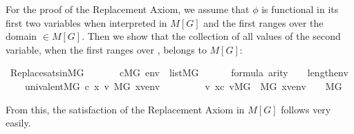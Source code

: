 For the proof of the Replacement Axiom, we assume that $\phi$ is
functional in its first two variables when interpreted in $M[G]$ and
the first ranges over the domain ${}\in M[G]$. Then we show
that the collection of
all values of the second variable, when the first ranges over
, belongs to $M[G]$:
%
\begin{isabelle}
\isamarkupfalse%
\ Replace{\isacharunderscore}sats{\isacharunderscore}in{\isacharunderscore}MG{\isacharcolon}\isanewline
\ \ \isanewline
\ \ \ \ {\isachardoublequoteopen}c{\isasymin}M{\isacharbrackleft}G{\isacharbrackright}{\isachardoublequoteclose}\ {\isachardoublequoteopen}env\ {\isasymin}\ list{\isacharparenleft}M{\isacharbrackleft}G{\isacharbrackright}{\isacharparenright}{\isachardoublequoteclose}\isanewline
\ \ \ \ {\isachardoublequoteopen}{\isasymphi}\ {\isasymin}\ formula{\isachardoublequoteclose}\ {\isachardoublequoteopen}arity{\isacharparenleft}{\isasymphi}{\isacharparenright}\ {\isasymle}\ {}\ {\isacharhash}{\isacharplus}\ length{\isacharparenleft}env{\isacharparenright}{\isachardoublequoteclose}\isanewline
\ \ \ \ {\isachardoublequoteopen}univalent{\isacharparenleft}{\isacharhash}{\isacharhash}M{\isacharbrackleft}G{\isacharbrackright}{\isacharcomma}\ c{\isacharcomma}\ {\isasymlambda}x\ v{\isachardot}\ {\isacharparenleft}M{\isacharbrackleft}G{\isacharbrackright}{\isacharcomma}\ {\isacharbrackleft}x{\isacharcomma}v{\isacharbrackright}{\isacharat}env\ {\isasymTurnstile}\ {\isasymphi}{\isacharparenright}{\isacharparenright}{\isachardoublequoteclose}\isanewline
\ \ \isanewline
\ \ \ \ {\isachardoublequoteopen}{\isacharbraceleft}v{\isachardot}\ x{\isasymin}c{\isacharcomma}\ v{\isasymin}M{\isacharbrackleft}G{\isacharbrackright}\ {\isasymand}\ {\isacharparenleft}M{\isacharbrackleft}G{\isacharbrackright}{\isacharcomma}\ {\isacharbrackleft}x{\isacharcomma}v{\isacharbrackright}{\isacharat}env\ {\isasymTurnstile}\ {\isasymphi}{\isacharparenright}{\isacharbraceright}\ {\isasymin}\ M{\isacharbrackleft}G{\isacharbrackright}{\isachardoublequoteclose}
\end{isabelle}
%
From this, the satisfaction of the Replacement Axiom in $M[G]$ follows
very easily.

